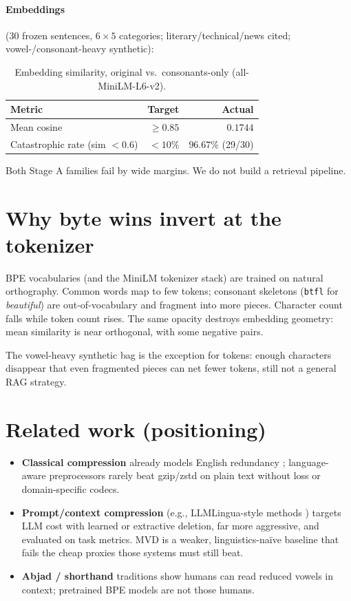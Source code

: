 \documentclass{article}
\begin{document}
\paragraph{Embeddings} (30 frozen sentences, $6\times5$ categories; literary/technical/news cited; vowel-/consonant-heavy synthetic):

\begin{table}[h]
	\caption{Embedding similarity, original vs.\ consonants-only (all-MiniLM-L6-v2).}
	\centering
	\begin{tabular}{lrr}
		\toprule
		Metric                              & Target       & Actual                \\
		\midrule
		Mean cosine                         & $\geq 0.85$  & $\mathbf{0.1744}$     \\
		Catastrophic rate (sim $< 0.6$)     & $< 10\%$     & $\mathbf{96.67\%}$ (29/30) \\
		\bottomrule
	\end{tabular}
	\label{tab:embeddings}
\end{table}

Both Stage A families fail by wide margins. We do not build a retrieval pipeline.

\FloatBarrier
\section{Why byte wins invert at the tokenizer}
\label{sec:why}

BPE vocabularies \citep{sennrich2016bpe} (and the MiniLM tokenizer stack) are trained on natural orthography. Common words map to few tokens; consonant skeletons (\texttt{btfl} for \emph{beautiful}) are out-of-vocabulary and fragment into more pieces. Character count falls while token count rises. The same opacity destroys embedding geometry: mean similarity is near orthogonal, with some negative pairs.

The vowel-heavy synthetic bag is the exception for tokens: enough characters disappear that even fragmented pieces can net fewer tokens, still not a general RAG strategy.

\section{Related work (positioning)}
\label{sec:related}

\begin{itemize}
	\item \textbf{Classical compression} already models English redundancy \citep{deutsch1996gzip, collet2021zstd}; language-aware preprocessors rarely beat gzip/zstd on plain text without loss or domain-specific codecs.
	\item \textbf{Prompt/context compression} (e.g., LLMLingua-style methods \citep{jiang2023llmlingua}) targets LLM cost with learned or extractive deletion, far more aggressive, and evaluated on task metrics. MVD is a weaker, linguistics-na\"ive baseline that fails the cheap proxies those systems must still beat.
	\item \textbf{Abjad / shorthand} traditions show humans can read reduced vowels in context; pretrained BPE models are not those humans.
\end{itemize}
\end{document}
